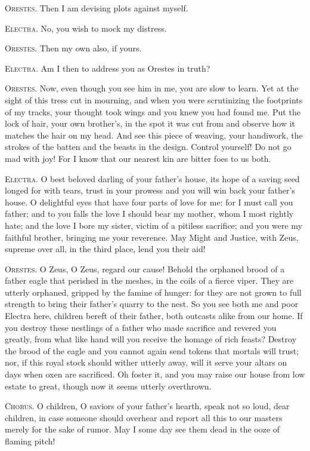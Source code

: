 \documentclass[12pt]{article}
\begin{document}
\textsc{Orestes.} Then I am devising plots against myself.

\textsc{Electra.} No, you wish to mock my distress.

\textsc{Orestes.} Then my own also, if yours.

\textsc{Electra.} Am I then to address you as Orestes in truth?

\textsc{Orestes.} Now, even though you see him in me, you are slow to learn. Yet at the sight of this tress cut in mourning, and when you were scrutinizing the footprints of my tracks, your thought took wings and you knew you had found me. Put the lock of hair, your own brother's, in the spot it was cut from and observe how it matches the hair on my head. And see this piece of weaving, your handiwork, the strokes of the batten and the beasts in the design. Control yourself! Do not go mad with joy! For I know that our nearest kin are bitter foes to us both.

\textsc{Electra.} O best beloved darling of your father's house, its hope of a saving seed longed for with tears, trust in your prowess and you will win back your father's house. O delightful eyes that have four parts of love for me: for I must call you father; and to you falls the love I should bear my mother, whom I most rightly hate; and the love I bore my sister, victim of a pitiless sacrifice; and you were my faithful brother, bringing me your reverence. May Might and Justice, with Zeus, supreme over all, in the third place, lend you their aid!

\textsc{Orestes.} O Zeus, O Zeus, regard our cause! Behold the orphaned brood of a father eagle that perished in the meshes, in the coils of a fierce viper. They are utterly orphaned, gripped by the famine of hunger: for they are not grown to full strength to bring their father's quarry to the nest. So you see both me and poor Electra here, children bereft of their father, both outcasts alike from our home. If you destroy these nestlings of a father who made sacrifice and revered you greatly, from what like hand will you receive the homage of rich feasts? Destroy the brood of the eagle and you cannot again send tokens that mortals will trust; nor, if this royal stock should wither utterly away, will it serve your altars on days when oxen are sacrificed. Oh foster it, and you may raise our house from low estate to great, though now it seems utterly overthrown.

\textsc{Chorus.} O children, O saviors of your father's hearth, speak not so loud, dear children, in case someone should overhear and report all this to our masters merely for the sake of rumor. May I some day see them dead in the ooze of flaming pitch!
\end{document}
